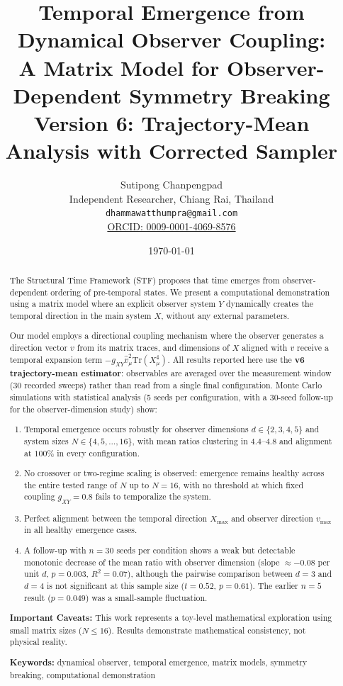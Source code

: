 \documentclass[12pt,a4paper]{article}
\title{\textbf{Temporal Emergence from Dynamical Observer Coupling:\\
       A Matrix Model for Observer-Dependent Symmetry Breaking}\\[0.5cm]
       \large Version 6: Trajectory-Mean Analysis with Corrected Sampler}
\author{Sutipong Chanpengpad\\
\small Independent Researcher, Chiang Rai, Thailand\\
\small \texttt{dhammawatthumpra@gmail.com}\\
\small \href{https://orcid.org/0009-0001-4069-8576}{ORCID: 0009-0001-4069-8576}}
\date{\today}
\begin{document}
\maketitle

\begin{abstract}
The Structural Time Framework (STF) proposes that time emerges from 
observer-dependent ordering of pre-temporal states. We present a 
computational demonstration using a matrix model where an explicit 
observer system $Y$ dynamically creates the temporal direction in 
the main system $X$, without any external parameters.

Our model employs a directional coupling mechanism where the observer 
generates a direction vector $v$ from its matrix traces, and dimensions 
of $X$ aligned with $v$ receive a temporal expansion term 
$-g_{XY} \hat{v}_\mu^2 \text{Tr}(X_\mu^4)$. All results reported here use the
\textbf{v6 trajectory-mean estimator}: observables are averaged over the
measurement window (30 recorded sweeps) rather than read from a single final
configuration. Monte Carlo simulations with statistical analysis (5 seeds per
configuration, with a $30$-seed follow-up for the observer-dimension study)
show:

\begin{enumerate}[leftmargin=*]
\item Temporal emergence occurs robustly for observer dimensions
      $d \in \{2,3,4,5\}$ and system sizes $N \in \{4,5,\ldots,16\}$, with
      mean ratios clustering in $4.4$--$4.8$ and alignment at $100\%$ in every
      configuration.
\item No crossover or two-regime scaling is observed: emergence remains
      healthy across the entire tested range of $N$ up to $N=16$, with no
      threshold at which fixed coupling $g_{XY}=0.8$ fails to temporalize the
      system.
\item Perfect alignment between the temporal direction $X_{\max}$ and 
      observer direction $v_{\max}$ in all healthy emergence cases.
\item A follow-up with $n=30$ seeds per condition shows a weak but
      detectable monotonic decrease of the mean ratio with observer
      dimension (slope $\approx -0.08$ per unit $d$, $p=0.003$, $R^2=0.07$),
      although the pairwise comparison between $d=3$ and $d=4$ is not
      significant at this sample size ($t=0.52$, $p=0.61$). The earlier
      $n=5$ result ($p=0.049$) was a small-sample fluctuation.
\end{enumerate}

\textbf{Important Caveats:} This work represents a toy-level 
mathematical exploration using small matrix sizes ($N \leq 16$). 
Results demonstrate mathematical consistency, not physical reality.

\medskip
\noindent\textbf{Keywords:} dynamical observer, temporal emergence, 
matrix models, symmetry breaking, computational demonstration
\end{abstract}
\end{document}
